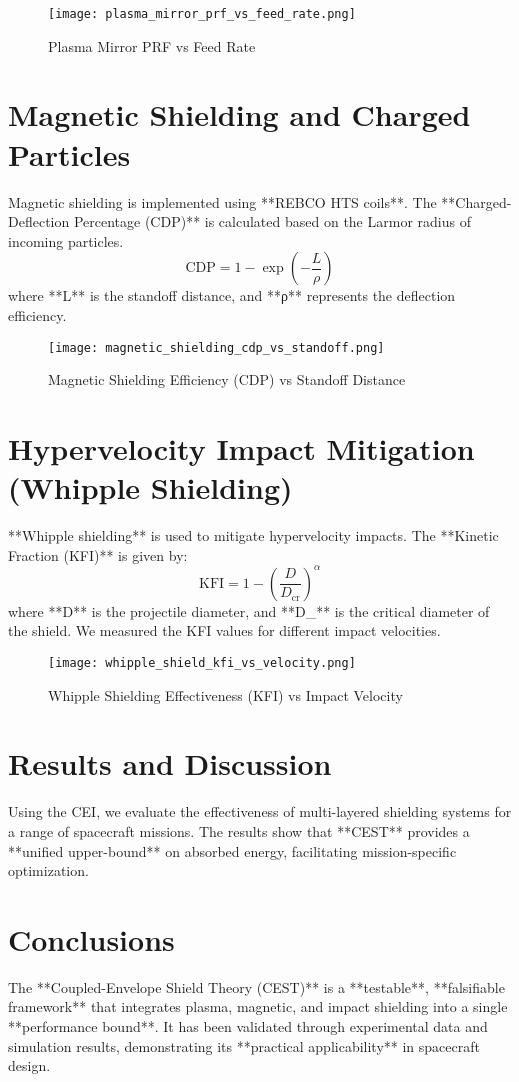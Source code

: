 \documentclass[12pt]{article}
\begin{document}
    \begin{figure}[h!]
        \centering
        \texttt{[image: plasma\_mirror\_prf\_vs\_feed\_rate.png]}
        \caption{Plasma Mirror PRF vs Feed Rate}
    \end{figure}

\section{Magnetic Shielding and Charged Particles}
    Magnetic shielding is implemented using **REBCO HTS coils**. The **Charged-Deflection Percentage (CDP)** is calculated based on the Larmor radius of incoming particles.
    \[
    \mathrm{CDP} = 1 - \exp\left(-\frac{L}{\rho}\right)
    \]
    where **L** is the standoff distance, and **ρ** represents the deflection efficiency.

    \begin{figure}[h!]
        \centering
        \texttt{[image: magnetic\_shielding\_cdp\_vs\_standoff.png]}
        \caption{Magnetic Shielding Efficiency (CDP) vs Standoff Distance}
    \end{figure}

\section{Hypervelocity Impact Mitigation (Whipple Shielding)}
    **Whipple shielding** is used to mitigate hypervelocity impacts. The **Kinetic Fraction (KFI)** is given by:
    \[
    \mathrm{KFI} = 1 - \left(\frac{D}{D_{\mathrm{cr}}}\right)^{\alpha}
    \]
    where **D** is the projectile diameter, and **D_{}** is the critical diameter of the shield. We measured the KFI values for different impact velocities.

    \begin{figure}[h!]
        \centering
        \texttt{[image: whipple\_shield\_kfi\_vs\_velocity.png]}
        \caption{Whipple Shielding Effectiveness (KFI) vs Impact Velocity}
    \end{figure}

\section{Results and Discussion}
    Using the CEI, we evaluate the effectiveness of multi-layered shielding systems for a range of spacecraft missions. The results show that **CEST** provides a **unified upper-bound** on absorbed energy, facilitating mission-specific optimization.

\section{Conclusions}
    The **Coupled-Envelope Shield Theory (CEST)** is a **testable**, **falsifiable framework** that integrates plasma, magnetic, and impact shielding into a single **performance bound**. It has been validated through experimental data and simulation results, demonstrating its **practical applicability** in spacecraft design.
\end{document}
